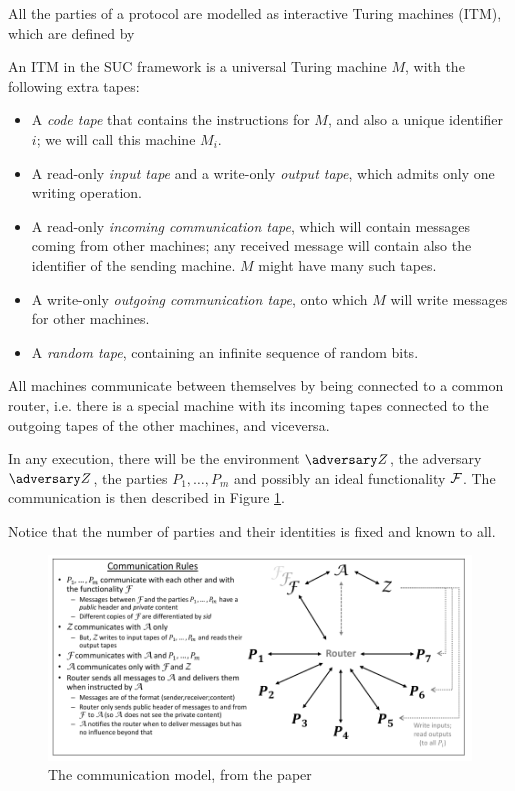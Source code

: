 All the parties of a protocol are modelled as interactive Turing machines (ITM), which are defined by
\begin{definition}
    An ITM in the SUC framework is a universal Turing machine $M$, with the following extra tapes:
    \begin{itemize}
        \item A \emph{code tape} that contains the instructions for $M$, and also a unique identifier $i$; we will call this machine $M_i$.
        \item A read-only \emph{input tape} and a write-only \emph{output tape}, which admits only one writing operation.
        \item A read-only \emph{incoming communication tape}, which will contain messages coming from other machines; any received message will contain also the identifier of the sending machine. $M$ might have many such tapes.
        \item A write-only \emph{outgoing communication tape}, onto which $M$ will write messages for other machines.
        \item A \emph{random tape}, containing an infinite sequence of random bits.
    \end{itemize}
\end{definition}

All machines communicate between themselves by being connected to a common router, i.e. there is a special machine with its incoming tapes connected to the outgoing tapes of the other machines, and viceversa.

In any execution, there will be the environment $\zdv$, the adversary $\zdv$, the parties $P_1,\dots,P_m$ and possibly an ideal functionality $\mathcal{F}$. The communication is then described in Figure \ref{SUC_router}.

Notice that the number of parties and their identities is fixed and known to all.

\begin{figure}
    \includegraphics[scale=0.9]{router}
    \caption{The communication model, from the \cite{Canetti_SUC} paper}
    \label{SUC_router}
\end{figure}

